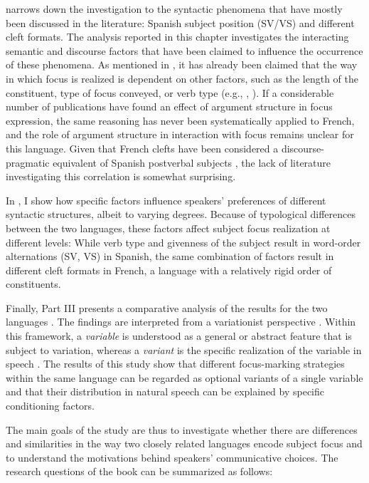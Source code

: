 \textsc{} narrows down the investigation to the syntactic phenomena that have mostly been discussed in the literature: Spanish subject position (SV/VS) and different cleft formats. The analysis reported in this chapter investigates the interacting semantic and discourse factors that have been claimed to influence the occurrence of these phenomena. As mentioned in , it has already been claimed that the way in which focus is realized is dependent on other factors, such as the length of the constituent, type of focus conveyed, or verb type (e.g., \cite{gutierrez2013structural}, \cite{gabriel2007fokus}). If a considerable number of publications have found an effect of argument structure in focus expression, the same reasoning has never been systematically applied to French, and the role of argument structure in interaction with focus remains unclear for this language. Given that French clefts have been  considered a discourse-pragmatic equivalent of Spanish postverbal subjects \parencite{lambrecht1996information, lambrecht2010constraints, belletti2008answering, lahousse2012word}, the lack of literature investigating this correlation is somewhat surprising.

In \textsc{}, I show how specific factors influence speakers' preferences of different syntactic structures, albeit to varying degrees. Because of typological differences between the two languages, these factors affect subject focus realization at different levels: While verb type and givenness of the subject result in word-order alternations (SV, VS) in Spanish, the same combination of factors result in different cleft formats in French, a language with a relatively rigid order of constituents.

Finally, Part III presents a comparative analysis of the results for the two languages \textsc{}. The findings are interpreted from a variationist perspective \parencite{labov1972sociolinguistic, labov1994principles, labov_2006}. Within this framework, a \textit{variable} is understood as a general or abstract feature that is subject to variation, whereas a \textit{variant} is the specific realization of the variable in speech \parencite{meyerhoff2018introducing}. The results of this study show that different focus-marking strategies within the same language can be regarded as optional variants of a single variable and that their distribution in natural speech can be explained by specific conditioning factors.

The main goals of the study are thus to investigate whether there are differences and similarities in the way two closely related languages encode subject focus and to understand the motivations behind speakers' communicative choices. The research questions of the book can be summarized as follows: 

